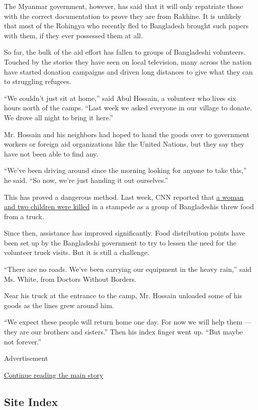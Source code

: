 The Myanmar government, however, has said that it will only repatriate
those with the correct documentation to prove they are from Rakhine. It
is unlikely that most of the Rohingya who recently fled to Bangladesh
brought such papers with them, if they ever possessed them at all.

So far, the bulk of the aid effort has fallen to groups of Bangladeshi
volunteers. Touched by the stories they have seen on local television,
many across the nation have started donation campaigns and driven long
distances to give what they can to struggling refugees.

``We couldn't just sit at home,'' said Abul Hossain, a volunteer who
lives six hours north of the camps. ``Last week we asked everyone in our
village to donate. We drove all night to bring it here.''

Mr. Hossain and his neighbors had hoped to hand the goods over to
government workers or foreign aid organizations like the United Nations,
but they say they have not been able to find any.

``We've been driving around since the morning looking for anyone to take
this,'' he said. ``So now, we're just handing it out ourselves.''

This has proved a dangerous method. Last week, CNN reported that
\href{http://edition.cnn.com/2017/09/17/asia/stampede-bangladesh-rohingya/index.html)}{a
woman and two children were killed} in a stampede as a group of
Bangladeshis threw food from a truck.

Since then, assistance has improved significantly. Food distribution
points have been set up by the Bangladeshi government to try to lessen
the need for the volunteer truck visits. But it is still a challenge.

``There are no roads. We've been carrying our equipment in the heavy
rain,'' said Ms. White, from Doctors Without Borders.

Near his truck at the entrance to the camp, Mr. Hossain unloaded some of
his goods as the lines grew around him.

``We expect these people will return home one day. For now we will help
them --- they are our brothers and sisters.'' Then his index finger went
up. ``But maybe not forever.''

Advertisement

\protect\hyperlink{after-bottom}{Continue reading the main story}

\hypertarget{site-index}{%
\subsection{Site Index}\label{site-index}}

